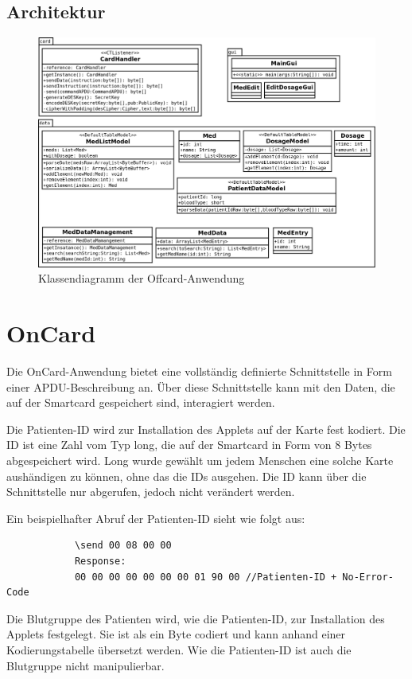 \documentclass[parskip]{scrartcl}
\begin{document}
		\subsection{Architektur}
		\begin{figure}[H]
			\centering
			\includegraphics[width=\linewidth]{./klassendiagramm.png}
			\caption{Klassendiagramm der Offcard-Anwendung}
			\label{fig:classdiagramm}
		\end{figure}
	
	\section{OnCard}
		Die OnCard-Anwendung bietet eine vollständig definierte Schnittstelle in Form einer APDU-Beschreibung an. Über diese Schnittstelle kann mit den Daten, die auf der Smartcard gespeichert sind, interagiert werden.
		
		Die Patienten-ID wird zur Installation des Applets auf der Karte fest kodiert. Die ID ist eine Zahl vom Typ long, die auf der Smartcard in Form von 8 Bytes abgespeichert wird. Long wurde gewählt um jedem Menschen eine solche Karte aushändigen zu können, ohne das die IDs ausgehen. Die ID kann über die Schnittstelle nur abgerufen, jedoch nicht verändert werden.
		
		Ein beispielhafter Abruf der Patienten-ID sieht wie folgt aus:
		
		\begin{lstlisting}
			\send 00 08 00 00
			Response:
			00 00 00 00 00 00 00 01 90 00 //Patienten-ID + No-Error-Code
		\end{lstlisting}
		
		Die Blutgruppe des Patienten wird, wie die Patienten-ID, zur Installation des Applets festgelegt. Sie ist als ein Byte codiert und kann anhand einer Kodierungstabelle übersetzt werden. Wie die Patienten-ID ist auch die Blutgruppe nicht manipulierbar.
		
\end{document}
